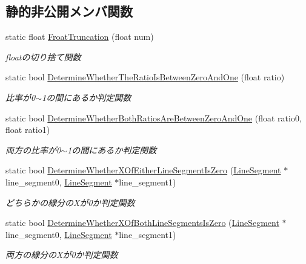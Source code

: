 \subsection*{静的非公開メンバ関数}
\begin{DoxyCompactItemize}
\item 
static float \mbox{\hyperlink{class_collision_calculation_a3123f561d5ba6af08336523205a5d8a8}{Froat\+Truncation}} (float num)
\begin{DoxyCompactList}\small\item\em floatの切り捨て関数 \end{DoxyCompactList}\item 
static bool \mbox{\hyperlink{class_collision_calculation_aa175baccc078543be38213d04a3af2b2}{Determine\+Whether\+The\+Ratio\+Is\+Between\+Zero\+And\+One}} (float ratio)
\begin{DoxyCompactList}\small\item\em 比率が0$\sim$1の間にあるか判定関数 \end{DoxyCompactList}\item 
static bool \mbox{\hyperlink{class_collision_calculation_abae15654adac71bcdbe0b9a31554c827}{Determine\+Whether\+Both\+Ratios\+Are\+Between\+Zero\+And\+One}} (float ratio0, float ratio1)
\begin{DoxyCompactList}\small\item\em 両方の比率が0$\sim$1の間にあるか判定関数 \end{DoxyCompactList}\item 
static bool \mbox{\hyperlink{class_collision_calculation_a7dffad18d15ed6e7a2e43888398afeeb}{Determine\+Whether\+X\+Of\+Either\+Line\+Segment\+Is\+Zero}} (\mbox{\hyperlink{class_line_segment}{Line\+Segment}} $\ast$line\+\_\+segment0, \mbox{\hyperlink{class_line_segment}{Line\+Segment}} $\ast$line\+\_\+segment1)
\begin{DoxyCompactList}\small\item\em どちらかの線分の\+Xが0か判定関数 \end{DoxyCompactList}\item 
static bool \mbox{\hyperlink{class_collision_calculation_abf9896120a5f4b2a7f816140fb19eafd}{Determine\+Whether\+X\+Of\+Both\+Line\+Segments\+Is\+Zero}} (\mbox{\hyperlink{class_line_segment}{Line\+Segment}} $\ast$line\+\_\+segment0, \mbox{\hyperlink{class_line_segment}{Line\+Segment}} $\ast$line\+\_\+segment1)
\begin{DoxyCompactList}\small\item\em 両方の線分の\+Xが0か判定関数 \end{DoxyCompactList}\item 

\end{DoxyCompactItemize}
